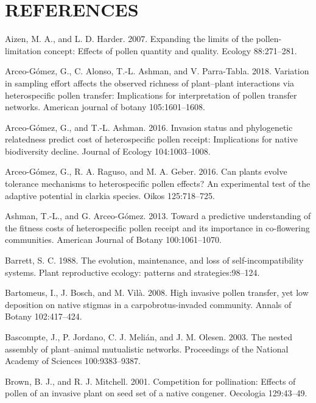 \documentclass[11pt,a4paper]{article}
\begin{document}
\section{REFERENCES}\label{references}

\hypertarget{refs}{}
\hypertarget{ref-aizen2007}{}
Aizen, M. A., and L. D. Harder. 2007. Expanding the limits of the
pollen-limitation concept: Effects of pollen quantity and quality.
Ecology 88:271--281.

\hypertarget{ref-arceo2018}{}
Arceo-Gómez, G., C. Alonso, T.-L. Ashman, and V. Parra-Tabla. 2018.
Variation in sampling effort affects the observed richness of
plant--plant interactions via heterospecific pollen transfer:
Implications for interpretation of pollen transfer networks. American
journal of botany 105:1601--1608.

\hypertarget{ref-arceo2016}{}
Arceo-Gómez, G., and T.-L. Ashman. 2016. Invasion status and
phylogenetic relatedness predict cost of heterospecific pollen receipt:
Implications for native biodiversity decline. Journal of Ecology
104:1003--1008.

\hypertarget{ref-arceo2016can}{}
Arceo-Gómez, G., R. A. Raguso, and M. A. Geber. 2016. Can plants evolve
tolerance mechanisms to heterospecific pollen effects? An experimental
test of the adaptive potential in clarkia species. Oikos 125:718--725.

\hypertarget{ref-ashman2013}{}
Ashman, T.-L., and G. Arceo-Gómez. 2013. Toward a predictive
understanding of the fitness costs of heterospecific pollen receipt and
its importance in co-flowering communities. American Journal of Botany
100:1061--1070.

\hypertarget{ref-barrett1988}{}
Barrett, S. C. 1988. The evolution, maintenance, and loss of
self-incompatibility systems. Plant reproductive ecology: patterns and
strategies:98--124.

\hypertarget{ref-bartomeus2008}{}
Bartomeus, I., J. Bosch, and M. Vilà. 2008. High invasive pollen
transfer, yet low deposition on native stigmas in a carpobrotus-invaded
community. Annals of Botany 102:417--424.

\hypertarget{ref-bascompte2003}{}
Bascompte, J., P. Jordano, C. J. Melián, and J. M. Olesen. 2003. The
nested assembly of plant--animal mutualistic networks. Proceedings of
the National Academy of Sciences 100:9383--9387.

\hypertarget{ref-brown2001}{}
Brown, B. J., and R. J. Mitchell. 2001. Competition for pollination:
Effects of pollen of an invasive plant on seed set of a native congener.
Oecologia 129:43--49.
\end{document}
